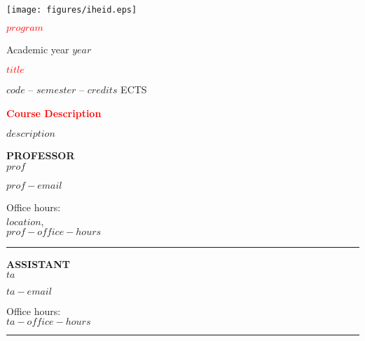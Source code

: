 \documentclass[11pt,a4paper]{article}
\author{$prof$}
\begin{document}
	

\hspace*{-1.25cm}
\texttt{[image: figures/iheid.eps]}
\vspace{0.25cm}


\begin{minipage}[t][98mm][t]{0.60\textwidth}
\textbf{\textcolor{red}{$program$}}

Academic year $year$
\vspace{0.25cm}

\textbf{\textcolor{red}{$title$}}

$code$ -- $semester$ -- $credits$ ECTS
\vspace{0.25cm}

\textbf{\textcolor{red}{Course Description}}

$description$
\vspace{0.25cm}
	\end{minipage}%
	\hspace{0.5cm}\vrule{}\hspace{0.5cm}
	\begin{minipage}[t][95mm][t]{0.30\textwidth}
	\begin{minipage}[t][37mm][t]{\textwidth}
	\textbf{PROFESSOR}\\
	
	$prof$
	
	\vspace{0.1cm}
	$prof-email$
	\vspace{0.1cm}
	
Office hours: \\
$location$,\\
$prof-office-hours$
	
	\end{minipage}
	\vspace{1cm}\hrule{}\vspace{0.5cm}
	\begin{minipage}[t][38mm][t]{\textwidth}
	\textbf{ASSISTANT}\\
	
	$ta$

	\vspace{0.1cm}
	$ta-email$
	\vspace{0.1cm}

Office hours: \\
$ta-office-hours$

	\end{minipage}
	\end{minipage}
	\hrule{}
	\vspace{0.5cm}
	
\end{document}
